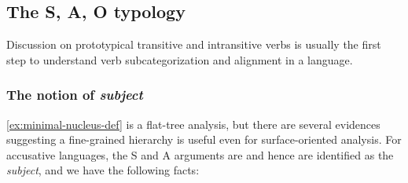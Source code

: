 \documentclass[UTF8, a4paper, oneside, scheme=plain]{ctexart}
\newcommand*{\term}[1]{\emph{#1}}
\begin{document}
\subsection{The S, A, O typology}

Discussion on prototypical transitive and intransitive verbs is usually the first step 
to understand verb subcategorization and alignment in a language.

\subsubsection{The notion of \term{subject}}\label{sec:subject-alignment}

\eqref{ex:minimal-nucleus-def} is a flat-tree analysis, 
but there are several evidences suggesting 
a fine-grained hierarchy is useful even for surface-oriented analysis.
For accusative languages, 
the S and A arguments are and hence are identified as the \term{subject}, 
and we have the following facts:
\end{document}
